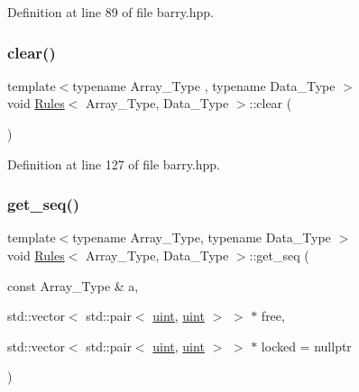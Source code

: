 Definition at line 89 of file barry.\+hpp.

\mbox{\label{classbarry_1_1_rules_a135a15d3ff70d4350d76a15f8e85f7df}} 
\subsubsection{\texorpdfstring{clear()}{clear()}}
{\footnotesize\ttfamily template$<$typename Array\+\_\+\+Type , typename Data\+\_\+\+Type $>$ \\
void \hyperlink{classbarry_1_1_rules}{Rules}$<$ Array\+\_\+\+Type, Data\+\_\+\+Type $>$\+::clear (\begin{DoxyParamCaption}{ }\end{DoxyParamCaption})\hspace{0.3cm}{\ttfamily [inline]}}



Definition at line 127 of file barry.\+hpp.

\mbox{\label{classbarry_1_1_rules_afc2e6ddd9cf384f9e70896ad6e581ed4}} 
\subsubsection{\texorpdfstring{get\+\_\+seq()}{get\_seq()}}
{\footnotesize\ttfamily template$<$typename Array\+\_\+\+Type, typename Data\+\_\+\+Type $>$ \\
void \hyperlink{classbarry_1_1_rules}{Rules}$<$ Array\+\_\+\+Type, Data\+\_\+\+Type $>$\+::get\+\_\+seq (\begin{DoxyParamCaption}\item[{const Array\+\_\+\+Type \&}]{a,  }\item[{std\+::vector$<$ std\+::pair$<$ \hyperlink{namespacebarry_a11dfc53ddb4672278319aa04f1e09a6c}{uint}, \hyperlink{namespacebarry_a11dfc53ddb4672278319aa04f1e09a6c}{uint} $>$ $>$ $\ast$}]{free,  }\item[{std\+::vector$<$ std\+::pair$<$ \hyperlink{namespacebarry_a11dfc53ddb4672278319aa04f1e09a6c}{uint}, \hyperlink{namespacebarry_a11dfc53ddb4672278319aa04f1e09a6c}{uint} $>$ $>$ $\ast$}]{locked = {\ttfamily nullptr} }\end{DoxyParamCaption})\hspace{0.3cm}{\ttfamily [inline]}}



